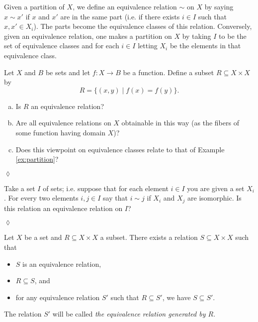 \documentclass{book}
\def\to{\rightarrow}
\def\taking{\colon}
\def\ss{\subseteq}
\def\|{{\;|\;}}
\theoremstyle{theoremENG}
\theoremstyle{lemmaENG}
\newtheorem{lemmaENG}[subsubsection]{\begin{english}Lemma\end{english}}
\theoremstyle{propositionENG}
\theoremstyle{corollaryENG}
\theoremstyle{factENG}
\theoremstyle{remarkENG}
\theoremstyle{exampleENG}
\newtheorem{exampleENG}[subsubsection]{\begin{english}Example\end{english}}
\theoremstyle{warningENG}
\theoremstyle{questionENG}
\theoremstyle{guessENG}
\theoremstyle{answerENG}
\theoremstyle{constructionENG}
\theoremstyle{rulesENG}
\theoremstyle{excENG}
\newtheorem{excENG}[subsubsection]{\begin{english}Exercise\end{english}}
\theoremstyle{appENG}
\theoremstyle{definitionENG}
\theoremstyle{notationENG}
\theoremstyle{conjectureENG}
\theoremstyle{postulateENG}
\newenvironment{exerciseENG}{\begin{excENG}}{\hspace*{\fill}$\lozenge$\end{excENG}}
\theoremstyle{theoremRUS}
\theoremstyle{lemmaRUS}
\theoremstyle{propositionRUS}
\theoremstyle{corollaryRUS}
\theoremstyle{factRUS}
\theoremstyle{remarkRUS}
\theoremstyle{exampleRUS}
\theoremstyle{warningRUS}
\theoremstyle{questionRUS}
\theoremstyle{guessRUS}
\theoremstyle{answerRUS}
\theoremstyle{constructionRUS}
\theoremstyle{rulesRUS}
\theoremstyle{excRUS}
\theoremstyle{appRUS}
\theoremstyle{definitionRUS}
\theoremstyle{notationRUS}
\theoremstyle{conjectureRUS}
\theoremstyle{postulateRUS}
\def\sexc{\begin{enumerate}[a.)]\setlength{\itemsep}{.1cm}\setlength{\parskip}{.1cm}\item}
\def\next{\item}
\def\endsexc{\end{enumerate}}
\begin{document}
\begin{english}
\begin{exampleENG}[Partitions]
\begin{russian} \end{russian}

Given a partition of $X$, we define an equivalence relation $\sim$ on $X$ by saying $x\sim x'$ if $x$ and $x'$ are in the same part (i.e. if there exists $i\in I$ such that $x,x'\in X_i$). The parts become the equivalence classes of this relation. Conversely, given an equivalence relation, one makes a partition on $X$ by taking $I$ to be the set of equivalence classes and for each $i\in I$ letting $X_i$ be the elements in that equivalence class.

\begin{russian} \end{russian}

\end{exampleENG}

\begin{exerciseENG}

Let $X$ and $B$ be sets and let $f\taking X\to B$ be a function. Define a subset $R\ss X\times X$ by $$R=\{(x,y)\|f(x)=f(y)\}.$$ 
\sexc Is $R$ an equivalence relation? 
\next Are all equivalence relations on $X$ obtainable in this way (as the fibers of some function having domain $X$)?
\next Does this viewpoint on equivalence classes relate to that of Example \ref{ex:partition}?
\endsexc

\begin{russian} \end{russian}

\end{exerciseENG}

\begin{exerciseENG}

Take a set $I$ of sets; i.e. suppose that for each element $i\in I$ you are given a set $X_i$. For every two elements $i,j\in I$ say that $i\sim j$ if $X_i$ and $X_j$ are isomorphic. Is this relation an equivalence relation on $I$?  

\begin{russian} \end{russian}

\end{exerciseENG}

\begin{lemmaENG}\label{lemma:generating ERs}

Let $X$ be a set and $R\ss X\times X$ a subset. There exists a relation $S\ss X\times X$ such that
\begin{itemize}
\item $S$ is an equivalence relation,
\item $R\ss S$, and
\item for any equivalence relation $S'$ such that $R\ss S'$, we have $S\ss S'$.
\end{itemize}
The relation $S'$ will be called {\em the equivalence relation generated by $R$}.


\end{lemmaENG}
\end{english}
\end{document}
